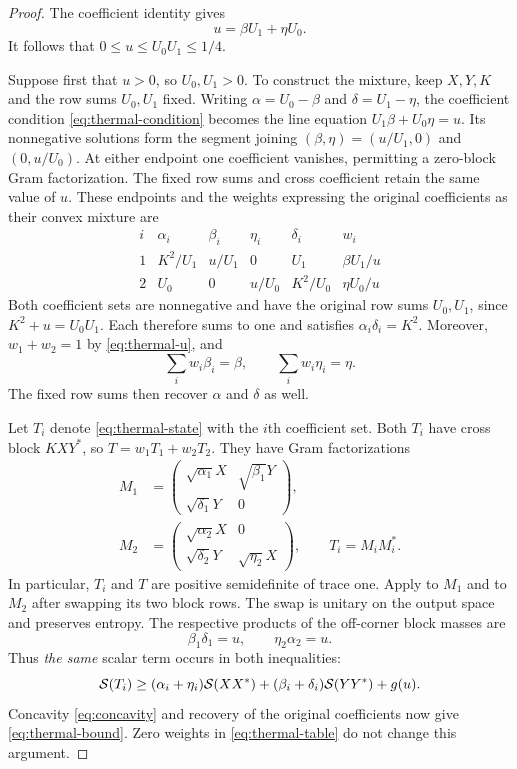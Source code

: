 \begin{proof}
The coefficient identity gives
\begin{equation}\label{eq:thermal-u}
 u=\beta U_1+\eta U_0.
\end{equation}
It follows that $0\le u\le U_0U_1\le1/4$.

Suppose first that $u>0$, so $U_0,U_1>0$. To construct the mixture,
keep $X,Y,K$ and the row sums $U_0,U_1$ fixed. Writing
$\alpha=U_0-\beta$ and $\delta=U_1-\eta$, the coefficient condition
\eqref{eq:thermal-condition} becomes the line equation
$U_1\beta+U_0\eta=u$. Its nonnegative solutions form the segment
joining $(\beta,\eta)=(u/U_1,0)$ and $(0,u/U_0)$. At either endpoint
one coefficient vanishes, permitting a zero-block Gram factorization.
The fixed row sums and cross coefficient retain the same value of $u$.
These endpoints and the weights expressing the original coefficients
as their convex mixture are
\begin{equation}\label{eq:thermal-table}
 \begin{array}{c|cccc|c}
 i&\alpha_i&\beta_i&\eta_i&\delta_i&w_i\\ \hline
 1&K^2/U_1&u/U_1&0&U_1&\beta U_1/u\\[2pt]
 2&U_0&0&u/U_0&K^2/U_0&\eta U_0/u
 \end{array}
\end{equation}
Both coefficient sets are nonnegative and have the original row sums
$U_0,U_1$, since $K^2+u=U_0U_1$. Each therefore sums to one and
satisfies $\alpha_i\delta_i=K^2$. Moreover, $w_1+w_2=1$ by
\eqref{eq:thermal-u}, and
\[
 \sum_iw_i\beta_i=\beta,\qquad
 \sum_iw_i\eta_i=\eta.
\]
The fixed row sums then recover $\alpha$ and $\delta$ as well.

Let $T_i$ denote \eqref{eq:thermal-state} with the $i$th coefficient
set. Both $T_i$ have cross block $KXY^*$, so
$T=w_1T_1+w_2T_2$. They have Gram factorizations
\begin{equation}\label{eq:thermal-factors}
 \begin{split}
 M_1&=\begin{pmatrix}
 \sqrt{\alpha_1}X&\sqrt{\beta_1}Y\\
 \sqrt{\delta_1}Y&0
 \end{pmatrix},\\
 M_2&=\begin{pmatrix}
 \sqrt{\alpha_2}X&0\\
 \sqrt{\delta_2}Y&\sqrt{\eta_2}X
 \end{pmatrix},\qquad T_i=M_iM_i^*.
 \end{split}
\end{equation}
In particular, $T_i$ and $T$ are positive semidefinite of trace one.
Apply  to $M_1$ and to $M_2$ after swapping its two
block rows. The swap is unitary on the output space and preserves
entropy. The respective products of the off-corner block masses are
\[
 \beta_1\delta_1=u,\qquad \eta_2\alpha_2=u.
\]
Thus \emph{the same} scalar term occurs in both inequalities:
\[
 \mathcal S(T_i)\ge(\alpha_i+\eta_i)\mathcal S(XX^*)
                 +(\beta_i+\delta_i)\mathcal S(YY^*)+g(u).
\]
Concavity \eqref{eq:concavity} and recovery of the original
coefficients now give \eqref{eq:thermal-bound}. Zero weights in
\eqref{eq:thermal-table} do not change this argument.


\end{proof}
